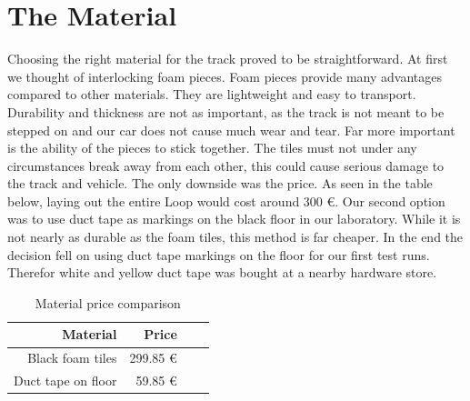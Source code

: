 \section{The Material}
Choosing the right material for the track proved to be straightforward. At first we thought of interlocking foam pieces. Foam pieces provide many advantages compared to other materials. They are lightweight and easy to transport. Durability and thickness are not as important, as the track is not meant to be stepped on and our car does not cause much wear and tear. Far more important is the ability of the pieces to stick together. The tiles must not under any circumstances break away from each other, this could cause serious damage to the track and vehicle. The only downside was the price. As seen in the table below, laying out the entire Loop would cost around 300 €. Our second option was to use duct tape as markings on the black floor in our laboratory. While it is not nearly as durable as the foam tiles, this method is far cheaper. In the end the decision fell on using duct tape markings on the floor for our first test runs. Therefor white and yellow duct tape was bought at a nearby hardware store.

\begin{table}
 \caption{Material price comparison}
 \label{tab:materials}
 \centering
 \setlength{\tabcolsep}{5mm}
 \def\arraystretch{1.25}
 \begin{tabular}{|r|r|c|c|}
 \hline
 \textbf{Material} & \textbf{Price} \\
 \hline\hline
 Black foam tiles & 299.85 € \\
 \hline
 Duct tape on floor & 59.85 € \\
 \hline
 \end{tabular}
 \end{table}

